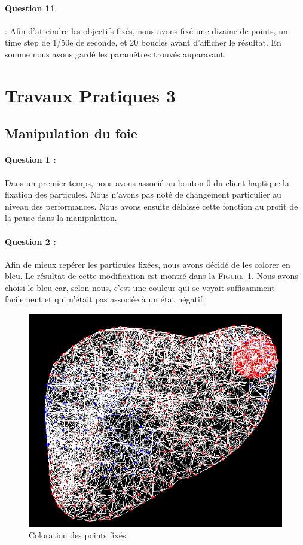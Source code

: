 \documentclass[a4paper,12pt]{article}
\begin{document}
\paragraph{Question 11} : Afin d'atteindre les objectifs fixés, nous avons fixé une dizaine de points, un time step de 1/50e de seconde, et 20 boucles avant d'afficher le résultat. En somme nous avons gardé les paramètres trouvés auparavant.

\section{Travaux Pratiques 3}

\subsection{Manipulation du foie}
\paragraph{Question 1 :} Dans un premier temps, nous avons associé au bouton 0 du client haptique la fixation des particules. Nous n'avons pas noté de changement particulier au niveau des performances. Nous avons ensuite délaissé cette fonction au profit de la pause dans la manipulation.

\paragraph{Question 2 :} Afin de mieux repérer les particules fixées, nous avons décidé de les colorer en bleu. Le résultat de cette modification est montré dans la \textsc{Figure}~\ref{fig:fixed}. Nous avons choisi le bleu car, selon nous, c'est une couleur qui se voyait suffisamment facilement et qui n'était pas associée à un état négatif.
\begin{figure}[ht!]
  \centering
  \includegraphics[width=\textwidth]{images/couleur_points_fixes.png}
  \caption{Coloration des points fixés.}
  \label{fig:fixed}
\end{figure}
\end{document}
